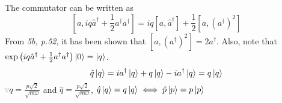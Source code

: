 \begin{sol}
\begin{enumerate}[label=\textbf{(\alph*)}]
    The commutator can be written as
    \begin{equation}
	\left[a, iq\hat a^\dagger+\frac{1}{2}a^\dagger a^\dagger\right]=iq[a,\hat a^\dagger]+\frac{1}{2}[a, (a^\dagger)^2]
\end{equation}
    From \textit{5b, p.52}, it has been shown that $[a, (a^\dagger)^2]=2a^\dagger$. Also, note that $\exp\left(iq\hat a^\dagger+\frac{1}{2}a^\dagger a^\dagger\right)\ket 0=\ket q$. 
    \begin{equation}
	\hat q\ket q=ia^\dagger \ket q+q\ket q-ia^\dagger \ket q=q\ket q
\end{equation}
   	$\because q=\frac{p\sqrt{2}}{\sqrt{m\omega}}$ and $\hat q = \frac{p\sqrt{2}}{\sqrt{m\omega}}$, $\hat q\ket q=q\ket q\iff\hat p\ket p=p\ket p$
\end{enumerate}
\end{sol}